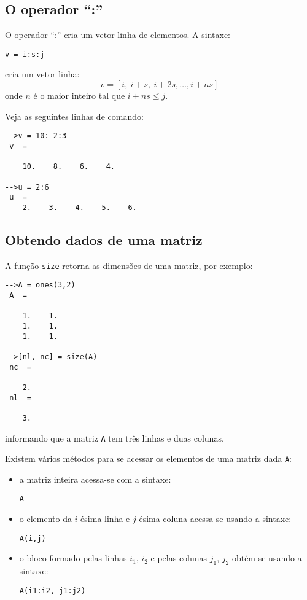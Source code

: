 \subsection{O operador ``:''}

O operador ``:'' cria um vetor linha de elementos. A sintaxe:
\begin{verbatim}
v = i:s:j
\end{verbatim}
cria um vetor linha:
\begin{equation*}
  v = [i,~i+s,~i+2s,\dotsc, i+ns]
\end{equation*}
onde $n$ é o maior inteiro tal que $i + ns \leq j$.

\begin{ex}
Veja as seguintes linhas de comando:
\begin{verbatim}
-->v = 10:-2:3
 v  =
 
    10.    8.    6.    4.  
 
-->u = 2:6
 u  =
    2.    3.    4.    5.    6.
\end{verbatim}
\end{ex}

\subsection{Obtendo dados de uma matriz}

A função \verb+size+ retorna as dimensões de uma matriz, por exemplo:
\begin{verbatim}
-->A = ones(3,2)
 A  =
 
    1.    1.  
    1.    1.  
    1.    1.  
 
-->[nl, nc] = size(A)
 nc  =
 
    2.  
 nl  =
 
    3.  
\end{verbatim}
informando que a matriz \verb+A+ tem três linhas e duas colunas.

Existem vários métodos para se acessar os elementos de uma matriz dada \verb+A+:
\begin{itemize}
\item a matriz inteira acessa-se com a sintaxe:
\begin{verbatim}
A
\end{verbatim}
\item o elemento da $i$-ésima linha e $j$-ésima coluna acessa-se usando a sintaxe:
\begin{verbatim}
A(i,j)
\end{verbatim}
\item o bloco formado pelas linhas $i_1$, $i_2$ e pelas colunas $j_1$, $j_2$ obtém-se usando a sintaxe:
\begin{verbatim}
A(i1:i2, j1:j2)
\end{verbatim}
\end{itemize}

